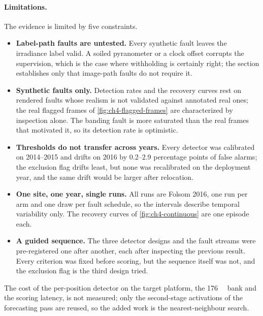 \paragraph{Limitations.} The evidence is limited by five constraints.
\begin{itemize}
  \item \textbf{Label-path faults are untested.} Every synthetic fault leaves the irradiance label valid. A soiled pyranometer or a clock offset corrupts the supervision, which is the case where withholding is certainly right; the section establishes only that image-path faults do not require it.
  \item \textbf{Synthetic faults only.} Detection rates and the recovery curves rest on rendered faults whose realism is not validated against annotated real ones; the real flagged frames of \cref{fig:ch4-flagged-frames} are characterized by inspection alone. The banding fault is more saturated than the real frames that motivated it, so its detection rate is optimistic.
  \item \textbf{Thresholds do not transfer across years.} Every detector was calibrated on 2014--2015 and drifts on 2016 by \numrange{0.2}{2.9} percentage points of false alarms; the exclusion flag drifts least, but none was recalibrated on the deployment year, and the same drift would be larger after relocation.
  \item \textbf{One site, one year, single runs.} All runs are Folsom 2016, one run per arm and one draw per fault schedule, so the intervals describe temporal variability only. The recovery curves of \cref{fig:ch4-continuous} are one episode each.
  \item \textbf{A guided sequence.} The three detector designs and the fault streams were pre-registered one after another, each after inspecting the previous result. Every criterion was fixed before scoring, but the sequence itself was not, and the exclusion flag is the third design tried.
\end{itemize}
The cost of the per-position detector on the target platform, the \SI{176}{\mega\byte} bank and the scoring latency, is not measured; only the second-stage activations of the forecasting pass are reused, so the added work is the nearest-neighbour search.

